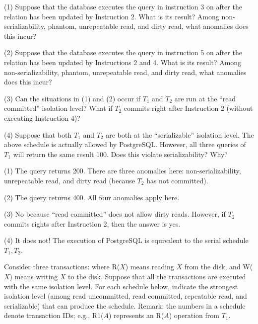 

(1) Suppose that the database executes the query in instruction 3 on  after the relation has been updated by Instruction 2. What is its result? Among non-serializability, phantom, unrepeatable read, and dirty read, what anomalies does this incur?

\vgap

(2) Suppose that the database executes the query in instruction 5 on  after the relation has been updated by Instructions 2 and 4. What is its result? Among non-serializability, phantom, unrepeatable read, and dirty read, what anomalies does this incur?

\vgap

(3) Can the situations in (1) and (2) occur if $T_1$ and $T_2$ are run at the ``read committed'' isolation level? What if $T_2$ commits right after Instruction 2 (without executing Instruction 4)?

\vgap

(4) Suppose that both $T_1$ and $T_2$ are both at the ``serializable'' isolation level. The above schedule is actually allowed by PostgreSQL. However, all three queries of $T_1$ will return the same result 100. Does this violate serializability? Why?

\begin{sol}
     (1) The query returns 200. There are three anomalies here: non-serializability, unrepeatable read, and dirty read (because $T_2$ has not committed).

    \vgap

    (2) The query returns 400. All four anomalies apply here.

    \vgap

    (3) No because ``read committed'' does not allow dirty reads. However, if $T_2$ commits rights after Instruction 2, then the answer is yes.

    \vgap

    (4) It does not! The execution of PostgreSQL is equivalent to the serial schedule $T_1, T_2$.
\end{sol}

 Consider three transactions:
where R($X$) means reading $X$ from the disk, and W($X$) means writing $X$ to the disk. Suppose that all the transactions are executed with the same isolation level. For each schedule below, indicate the strongest isolation level (among read uncommitted, read committed, repeatable read, and serializable) that can produce the schedule. Remark: the numbers in a schedule denote transaction IDs; e.g., R1($A$) represents an R($A$) operation from $T_1$.

